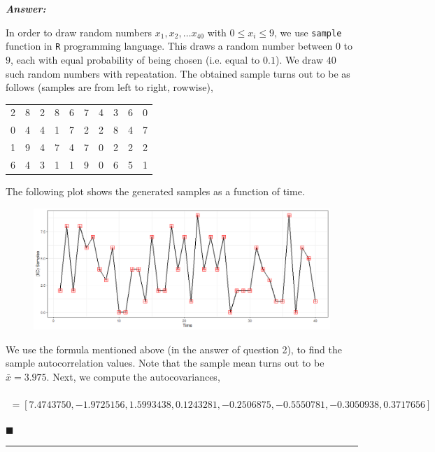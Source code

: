 \documentclass[12pt]{article}
\theoremstyle{definition}
\newenvironment{answer}{
    \textbf{\textit{Answer:}} \qquad
}{\hfill $\blacksquare$ \\ \begin{center}
    \rule{0.6\linewidth}{0.5px}    
\end{center}
}
\begin{document}
\begin{answer}
    In order to draw random numbers $x_1, x_2, \dots x_{40}$ with $0 \leq x_i \leq 9$, we use \texttt{sample} function in \texttt{R} programming language. This draws a random number between $0$ to $9$, each with equal probability of being chosen (i.e. equal to $0.1$). We draw $40$ such random numbers with repeatation. The obtained sample turns out to be as follows (samples are from left to right, rowwise),

    \begin{center}
        \begin{tabular}{cccccccccc}
            2 & 8 & 2 & 8 & 6 & 7 & 4 & 3 & 6 & 0\\
            0 & 4 & 4 & 1 & 7 & 2 & 2 & 8 & 4 & 7 \\
            1 & 9 & 4 & 7 & 4 & 7 & 0 & 2 & 2 & 2 \\
            6 & 4 & 3 & 1 & 1 & 9 & 0 & 6 & 5 & 1
        \end{tabular}
    \end{center}

    The following plot shows the generated samples as a function of time.

    \begin{figure}[H]
        \includegraphics[width = \linewidth]{iid_seq.png}
    \end{figure}

    We use the formula mentioned above (in the answer of question 2), to find the sample autocorrelation values. Note that the sample mean turns out to be $\bar{x} = 3.975$. Next, we compute the autocovariances, 

    \begin{multline*}
        [\widehat{\gamma}(0), \ldots, \widehat{\gamma}(7)] \\
        = [7.4743750, -1.9725156,  1.5993438,  0.1243281, -0.2506875, -0.5550781, -0.3050938, 0.3717656]            
    \end{multline*}


\end{answer}
\end{document}

